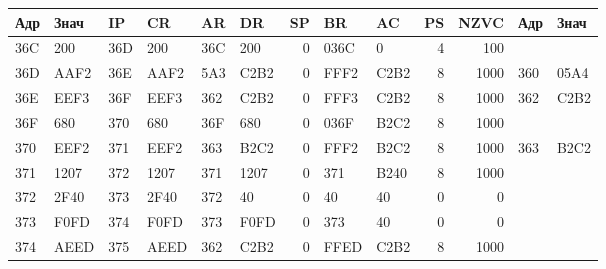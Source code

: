 \begin{center}
    \centering
    \begin{tabular}{|l|l|l|l|l|l|r|l|l|r|r|l|l|}
        \toprule
        \textbf{Адр} & \textbf{Знач} & \textbf{IP} & \textbf{CR} & \textbf{AR} & \textbf{DR} & \textbf{SP} & \textbf{BR} & \textbf{AC} & \textbf{PS} & \textbf{NZVC} & \textbf{Адр} & \textbf{Знач} \\
        \midrule
        36C          & 200           & 36D         & 200         & 36C         & 200         & 0           & 036C        & 0           & 4           & 100           &              &               \\
        \hline
        36D          & AAF2          & 36E         & AAF2        & 5A3         & C2B2        & 0           & FFF2        & C2B2        & 8           & 1000          & 360          & 05A4          \\
        \hline
        36E          & EEF3          & 36F         & EEF3        & 362         & C2B2        & 0           & FFF3        & C2B2        & 8           & 1000          & 362          & C2B2          \\
        \hline
        36F          & 680           & 370         & 680         & 36F         & 680         & 0           & 036F        & B2C2        & 8           & 1000          &              &               \\
        \hline
        370          & EEF2          & 371         & EEF2        & 363         & B2C2        & 0           & FFF2        & B2C2        & 8           & 1000          & 363          & B2C2          \\
        \hline
        371          & 1207          & 372         & 1207        & 371         & 1207        & 0           & 371         & B240        & 8           & 1000          &              &               \\
        \hline
        372          & 2F40          & 373         & 2F40        & 372         & 40          & 0           & 40          & 40          & 0           & 0             &              &               \\
        \hline
        373          & F0FD          & 374         & F0FD        & 373         & F0FD        & 0           & 373         & 40          & 0           & 0             &              &               \\
        \hline
        374          & AEED          & 375         & AEED        & 362         & C2B2        & 0           & FFED        & C2B2        & 8           & 1000          &              &               \\

\end{tabular}
\end{center}

